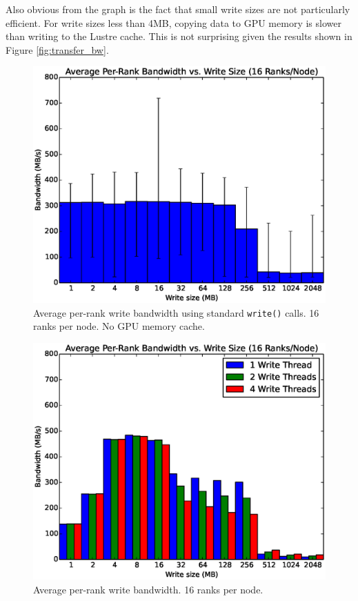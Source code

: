 Also obvious from the graph is the fact that small write sizes are not particularly efficient.  For write sizes less than 4MB, copying data to GPU memory is slower than writing to the Lustre cache.  This is not surprising given the results shown in Figure \ref{fig:transfer_bw}.



\begin{figure}
\includegraphics[width=\linewidth]{figures/figure_6.eps}
\caption{Average per-rank write bandwidth using standard \texttt{write()} calls.  16 ranks per node. No GPU memory cache.} 
\label{fig:results_base_16}
\end{figure}

\begin{figure}
\includegraphics[width=\linewidth]{figures/figure_4.eps}
\caption{Average per-rank write bandwidth.  16 ranks per node.} 
\label{fig:results_16_nobars}
\end{figure}

